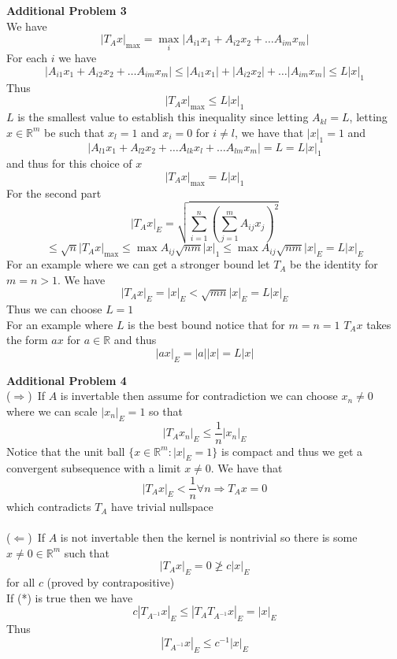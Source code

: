 \documentclass[12pt]{article}
\newenvironment{ques}[1]{\textbf{#1}\vspace{1 mm}\\ }{\bigskip}
\theoremstyle{definition}
\renewcommand{\l}{\left }
\renewcommand{\r}{\right }
\newcommand{\R}{\mathbb R}
\begin{document}
\begin{ques}{Additional Problem 3}
	We have 
	$$|T_Ax|_{\max} = \max_i|A_{i1}x_1 + A_{i2}x_2 + \dots A_{im}x_m|$$
	For each $i$ we have
	$$|A_{i1}x_1 + A_{i2}x_2 + \dots A_{im}x_m| \leq |A_{i1}x_1| +
	|A_{i2}x_2| + \dots |A_{im}x_m| \leq L|x|_1$$
	Thus 
	$$|T_Ax|_{\max} \leq L|x|_1$$
	$L$ is the smallest value to establish this inequality since letting
	$A_{kl} = L$, letting $x \in \R^m$ be such that $x_l = 1$ and $x_i = 0$ for
	$i \neq l$, we have that $|x|_1 = 1$ and
	$$|A_{l1}x_1 + A_{l2}x_2 + \dots A_{lk}x_l + \dots A_{lm}x_m| = L = L|x|_1$$
	and thus for this choice of $x$
	$$|T_Ax|_{\max} = L|x|_1$$
	For the second part 
	$$|T_A x|_E = \sqrt{\sum_{i=1}^n \l(\sum_{j=1}^m A_{ij}x_j \r)^2 }$$
	$$\leq \sqrt n|T_Ax|_{\max} \leq \max A_{ij} \sqrt{ nm} |x|_1 \leq \max
	A_{ij} \sqrt{nm} |x|_E = L|x|_E$$
	For an example where we can get a stronger bound let $T_A$ be the identity for $m =
	n > 1$. We have
	$$|T_Ax|_E = |x|_E < \sqrt{mn}|x|_E = L|x|_E$$
	Thus we can choose $L = 1$\\
	For an example where $L$ is the best bound notice that for $m = n = 1$
	$T_Ax$ takes the form $ax$ for $a \in \R$ and thus 
	$$|ax|_E = |a||x| = L|x|$$
\end{ques}

\begin{ques}{Additional Problem 4}
	($\Rightarrow$)\ If $A$ is invertable then assume for contradiction we can
	choose $x_n \neq 0$ where we can scale $|x_n|_E = 1$ so that 
	$$|T_A x_n|_E \leq \frac 1 n |x_n|_E$$
	Notice that the unit ball $\{x \in \R^m: |x|_E = 1\}$ is compact and thus
	we get a convergent subsequence with a limit $x \neq 0$. We have that
	$$|T_Ax|_E < \frac 1 n \forall n \Rightarrow T_Ax = 0$$
	which contradicts $T_A$ have trivial nullspace\\
	\\
	($\Leftarrow$)\ If $A$ is not invertable then the kernel is nontrivial so
	there is some $x \neq 0 \in \R^m$ such that
	$$|T_Ax|_E = 0 \not \geq c|x|_E$$
	for all $c$ (proved by contrapositive) \\
	If (*) is true then we have
	$$c|T_{A^{-1}}x|_E \leq |T_AT_{A^{-1}}x|_E = |x|_E$$
	Thus
	$$|T_{A^{-1}}x|_E \leq c^{-1}|x|_E$$
\end{ques}
\end{document}
